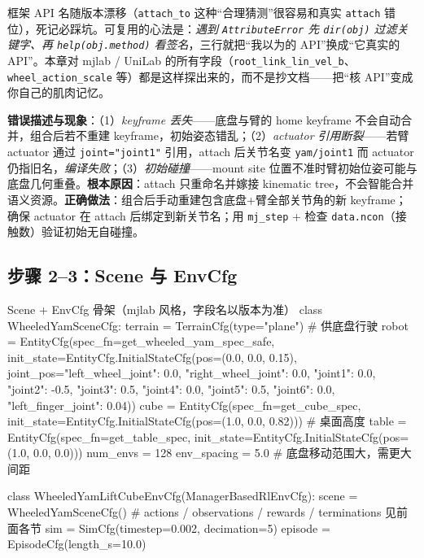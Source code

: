 \begin{insight}\label{ins:rlmc-wh-probe}
框架 API 名随版本漂移（\verb|attach_to| 这种“合理猜测”很容易和真实 \verb|attach| 错位），死记必踩坑。可复用的心法是：\emph{遇到 \texttt{AttributeError} 先 \texttt{dir(obj)} 过滤关键字、再 \texttt{help(obj.method)} 看签名}，三行就把“我以为的 API”换成“它真实的 API”。本章对 mjlab / UniLab 的所有字段（\verb|root_link_lin_vel_b|、\verb|wheel_action_scale| 等）都是这样探出来的，而不是抄文档——把“核 API”变成你自己的肌肉记忆。
\end{insight}

\begin{pitfall}
\textbf{错误描述与现象}：（1）\emph{keyframe 丢失}——底盘与臂的 home keyframe 不会自动合并，组合后若不重建 keyframe，初始姿态错乱；（2）\emph{actuator 引用断裂}——若臂 actuator 通过 \verb|joint="joint1"| 引用，attach 后关节名变 \verb|yam/joint1| 而 actuator 仍指旧名，\emph{编译失败}；（3）\emph{初始碰撞}——mount site 位置不准时臂初始位姿可能与底盘几何重叠。\textbf{根本原因}：attach 只重命名并嫁接 kinematic tree，不会智能合并语义资源。\textbf{正确做法}：组合后手动重建包含底盘+臂全部关节角的新 keyframe；确保 actuator 在 attach 后绑定到新关节名；用 \verb|mj_step| + 检查 \verb|data.ncon|（接触数）验证初始无自碰撞。
\end{pitfall}

\subsection{步骤 2--3：Scene 与 EnvCfg}
\label{sec:rlmc-wh-scene}

\begin{codebox}[Python]{Scene + EnvCfg 骨架（mjlab 风格，字段名以版本为准）}
class WheeledYamSceneCfg:
    terrain = TerrainCfg(type="plane")                 # 供底盘行驶
    robot = EntityCfg(spec_fn=get_wheeled_yam_spec_safe,
        init_state=EntityCfg.InitialStateCfg(pos=(0.0, 0.0, 0.15),
            joint_pos={"left_wheel_joint": 0.0, "right_wheel_joint": 0.0,
                       "joint1": 0.0, "joint2": -0.5, "joint3": 0.5,
                       "joint4": 0.0, "joint5": 0.5, "joint6": 0.0,
                       "left_finger_joint": 0.04}))
    cube  = EntityCfg(spec_fn=get_cube_spec,
        init_state=EntityCfg.InitialStateCfg(pos=(1.0, 0.0, 0.82)))   # 桌面高度
    table = EntityCfg(spec_fn=get_table_spec,
        init_state=EntityCfg.InitialStateCfg(pos=(1.0, 0.0, 0.0)))
    num_envs = 128
    env_spacing = 5.0   # 底盘移动范围大，需更大间距

class WheeledYamLiftCubeEnvCfg(ManagerBasedRlEnvCfg):
    scene = WheeledYamSceneCfg()
    # actions / observations / rewards / terminations 见前面各节
    sim = SimCfg(timestep=0.002, decimation=5)
    episode = EpisodeCfg(length_s=10.0)
\end{codebox}

